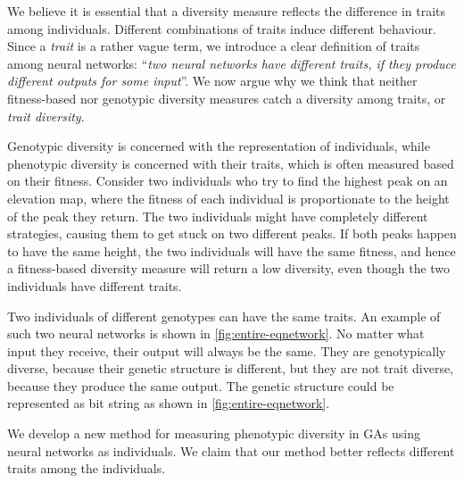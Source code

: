 We believe it is essential that a diversity measure reflects the difference in traits among individuals. Different combinations of traits induce different behaviour. Since a \emph{trait} is a rather vague term, we introduce a clear definition of traits among neural networks: ``\emph{two neural networks have different traits, if they produce different outputs for some input}''. We now argue why we think that neither fitness-based nor genotypic diversity measures catch a diversity among traits, or \emph{trait diversity}.

Genotypic diversity is concerned with the representation of individuals, while phenotypic diversity is concerned with their traits, which is often measured based on their fitness. Consider two individuals who try to find the highest peak on an elevation map, where the fitness of each individual is proportionate to the height of the peak they return. The two individuals might have completely different strategies, causing them to get stuck on two different peaks. If both peaks happen to have the same height, the two individuals will have the same fitness, and hence a fitness-based diversity measure will return a low diversity, even though the two individuals have different traits.

Two individuals of different genotypes can have the same traits. An example of such two neural networks is shown in \cref{fig:entire-eqnetwork}. No matter what input they receive, their output will always be the same. They are genotypically diverse, because their genetic structure is different, but they are not trait diverse, because they produce the same output. The genetic structure could be represented as bit string as shown in \cref{fig:entire-eqnetwork}.
%

%
We develop a new method for measuring phenotypic diversity in GAs using neural networks as individuals. We claim that our method better reflects different traits among the individuals.

